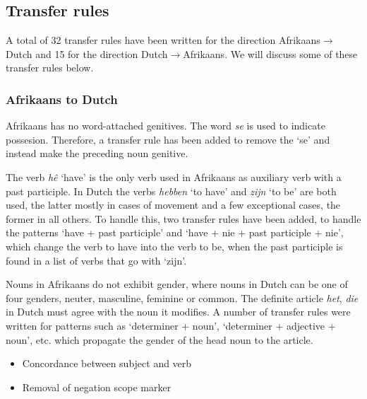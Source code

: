 \documentclass[11pt]{article}
\begin{document}
\subsection{Transfer rules}

A total of 32 transfer rules have been written for the direction Afrikaans$\rightarrow$Dutch and
15 for the direction Dutch$\rightarrow$Afrikaans. We will discuss some of these transfer rules below.

\subsubsection{Afrikaans to Dutch}


Afrikaans has no word-attached genitives. The word \emph{se} is used to indicate possesion. 
Therefore, a transfer rule has been added to remove the `se' and instead make the preceding
noun genitive.


The verb \emph{hê} `have' is the only verb used in Afrikaans as auxiliary
verb with a past participle. In Dutch the verbs \emph{hebben} `to have' and \emph{zijn} `to be' 
are both used, the latter mostly in cases of movement and a few exceptional cases, the
former in all others. To handle this, two transfer rules have been added, to handle the
patterns `have + past participle' and `have + nie + past participle + nie', which change the
verb to have into the verb to be, when the past participle is found in a list of verbs that go with
`zijn'.



Nouns in Afrikaans do not exhibit gender, where nouns in Dutch can be one of four genders,
neuter, masculine, feminine or common. The definite article \emph{het}, \emph{die} in Dutch must agree with 
the noun it modifies. A number of transfer rules were written for patterns such as `determiner + noun',
`determiner + adjective + noun', etc. which propagate the gender of the head noun to the article.

\begin{itemize}
\item Concordance between subject and verb
\item Removal of negation scope marker
\end{itemize}
\end{document}
